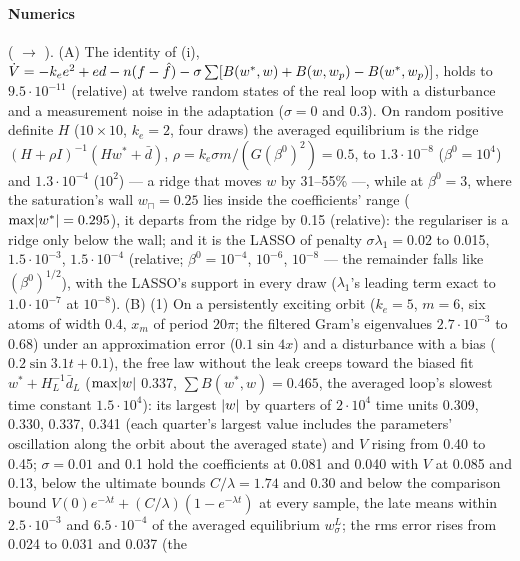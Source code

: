 \begin{sloppypar}
\paragraph{Numerics} ( $\to$ ). (A) The identity of (i),
$\dot V = -k_ee^2 + ed - n(f - \hat f) - \sigma\sum[B(w^*,w) + B(w,w_p) - B(w^*,w_p)]$, holds to $9.5\cdot10^{-11}$
(relative) at twelve random states of the real loop with a disturbance and a measurement noise in the adaptation
($\sigma = 0$ and 0.3). On random positive definite $H$ ($10\times10$, $k_e = 2$, four draws) the averaged equilibrium
is the ridge $(H + \rho I)^{-1}(Hw^* + \bar d)$, $\rho = k_e\sigma m/(G(\beta^0)^2) = 0.5$, to $1.3\cdot10^{-8}$
($\beta^0 = 10^4$) and $1.3\cdot10^{-4}$ ($10^2$) --- a ridge that moves $w$ by 31--55\% ---, while at $\beta^0 = 3$,
where the saturation's wall $w_\sqcap = 0.25$ lies inside the coefficients' range ($\max\lvert w^*\rvert = 0.295$), it departs
from the ridge by 0.15 (relative): the regulariser is a ridge only below the wall; and it is the LASSO of penalty
$\sigma\lambda_1 = 0.02$ to 0.015, $1.5\cdot10^{-3}$, $1.5\cdot10^{-4}$ (relative; $\beta^0 = 10^{-4}$, $10^{-6}$,
$10^{-8}$ --- the remainder falls like $(\beta^0)^{1/2}$), with the LASSO's support in every draw ($\lambda_1$'s leading
term exact to $1.0\cdot10^{-7}$ at $10^{-8}$). (B) (1) On a persistently exciting orbit ($k_e = 5$, $m = 6$, six atoms of
width 0.4, $x_m$ of period $20\pi$; the filtered Gram's eigenvalues $2.7\cdot10^{-3}$ to 0.68) under an approximation
error ($0.1\sin4x$) and a disturbance with a bias ($0.2\sin3.1t + 0.1$), the free law without the leak creeps toward the
biased fit $w^* + H_L^{-1}\bar d_L$ ($\max\lvert w\rvert$ 0.337, $\sum B(w^*,w) = 0.465$, the averaged loop's slowest time
constant $1.5\cdot10^4$): its largest $\lvert w\rvert$ by quarters of $2\cdot10^4$ time units 0.309, 0.330, 0.337, 0.341 (each
quarter's largest value includes the parameters' oscillation along the orbit about the averaged state) and $V$ rising
from 0.40 to 0.45; $\sigma = 0.01$ and 0.1 hold the coefficients at 0.081 and 0.040 with $V$ at 0.085 and 0.13, below
the ultimate bounds $C/\lambda = 1.74$ and 0.30 and below the comparison bound
$V(0)e^{-\lambda t} + (C/\lambda)(1 - e^{-\lambda t})$ at every sample, the late means within $2.5\cdot10^{-3}$ and
$6.5\cdot10^{-4}$ of the averaged equilibrium $w_\sigma^L$; the rms error rises from 0.024 to 0.031 and 0.037 (the

\end{sloppypar}

